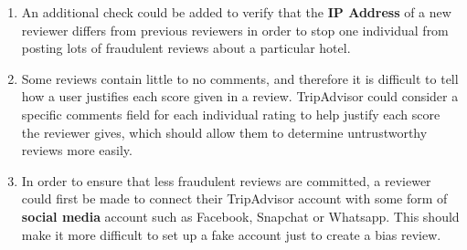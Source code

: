 \documentclass{article}
\begin{document}
	\begin{enumerate}
		\item An additional check could be added to verify that the \textbf{IP Address} of a new reviewer differs from previous reviewers in order to stop one individual from posting lots of fraudulent reviews about a particular hotel.
		\item Some reviews contain little to no comments, and therefore it is difficult to tell how a user justifies each score given in a review. TripAdvisor could consider a specific comments field for each individual rating to help justify each score the reviewer gives, which should allow them to determine untrustworthy reviews more easily.
		\item In order to ensure that less fraudulent reviews are committed, a reviewer could first be made to connect their TripAdvisor account with some form of \textbf{social media} account such as Facebook, Snapchat or Whatsapp. This should make it more difficult to set up a fake account just to create a bias review.
	\end{enumerate}
	
\end{document}
